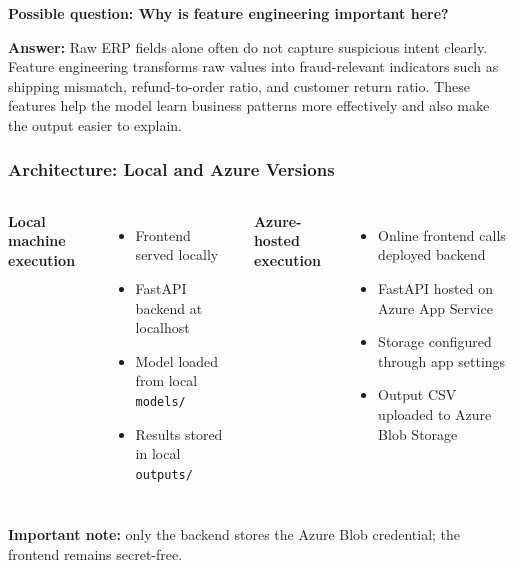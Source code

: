 \documentclass{beamer}
\begin{document}
\begin{frame}
{\textbf{Possible question: Why is feature engineering important here?}

\textbf{Answer:} Raw ERP fields alone often do not capture suspicious intent clearly. Feature engineering transforms raw values into fraud-relevant indicators such as shipping mismatch, refund-to-order ratio, and customer return ratio. These features help the model learn business patterns more effectively and also make the output easier to explain.
}
\end{frame}

\begin{frame}
\frametitle{Architecture: Local and Azure Versions}
\begin{columns}[T]
\textbf{Local machine execution}
\begin{itemize}
    \item Frontend served locally
    \item FastAPI backend at localhost
    \item Model loaded from local \texttt{models/}
    \item Results stored in local \texttt{outputs/}
\end{itemize}

\textbf{Azure-hosted execution}
\begin{itemize}
    \item Online frontend calls deployed backend
    \item FastAPI hosted on Azure App Service
    \item Storage configured through app settings
    \item Output CSV uploaded to Azure Blob Storage
\end{itemize}
\end{columns}

\vspace{0.3cm}
\begin{center}
\small \textbf{Important note:} only the backend stores the Azure Blob credential; the frontend remains secret-free.
\end{center}
\end{frame}
\end{document}
